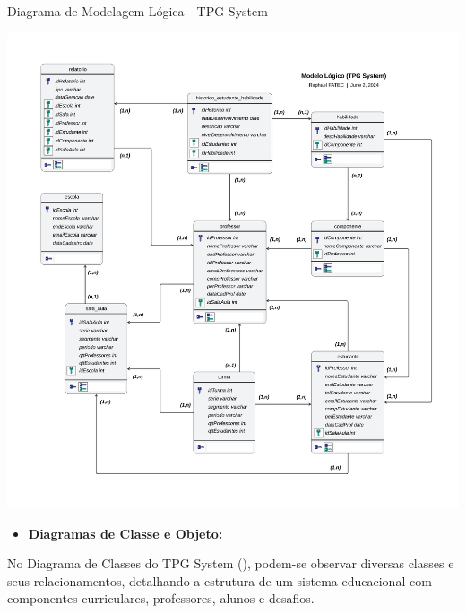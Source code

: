 \begin{flowchart}[!h]
\centering
\caption{Diagrama de Modelagem Lógica - TPG System}%
\label{fcht:imgdgML.jpg}
\includegraphics[scale=0.55]{Illustrations/imgdgML.jpg}
\end{flowchart}

\begin{itemize}

\item \textbf{Diagramas de Classe e Objeto:}
\\

\end{itemize}

No Diagrama de Classes do TPG System (), podem-se observar diversas classes e seus relacionamentos, detalhando a estrutura de um sistema educacional com componentes curriculares, professores, alunos e desafios.
\\

